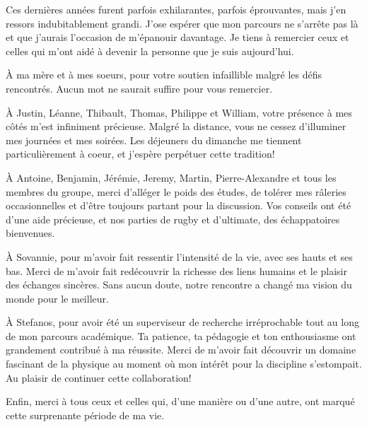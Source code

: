 \begin{comment}
\end{comment}

Ces dernières années furent parfois exhilarantes, parfois éprouvantes, mais j'en ressors indubitablement grandi. J'ose espérer que mon parcours ne s'arrête pas là et que j'aurais l'occasion de m'épanouir davantage. Je tiens à remercier ceux et celles qui m'ont aidé à devenir la personne que je suis aujourd'hui.

À ma mère et à mes soeurs, pour votre soutien infaillible malgré les défis rencontrés. Aucun mot ne saurait suffire pour vous remercier.

À Justin, Léanne, Thibault, Thomas, Philippe et William, votre présence à mes côtés m'est infiniment précieuse. Malgré la distance, vous ne cessez d'illuminer mes journées et mes soirées. Les déjeuners du dimanche me tiennent particulièrement à coeur, et j'espère perpétuer cette tradition!

À Antoine, Benjamin, Jérémie, Jeremy, Martin, Pierre-Alexandre et tous les membres du groupe, merci d'alléger le poids des études, de tolérer mes râleries occasionnelles et d'être toujours partant pour la discussion. Vos conseils ont été d'une aide précieuse, et nos parties de rugby et d'ultimate, des échappatoires bienvenues.

À Sovannie, pour m'avoir fait ressentir l'intensité de la vie, avec ses hauts et ses bas. Merci de m'avoir fait redécouvrir la richesse des liens humains et le plaisir des échanges sincères. Sans aucun doute, notre rencontre a changé ma vision du monde pour le meilleur.

À Stefanos, pour avoir été un superviseur de recherche irréprochable tout au long de mon parcours académique. Ta patience, ta pédagogie et ton enthousiasme ont grandement contribué à ma réussite. Merci de m'avoir fait découvrir un domaine fascinant de la physique au moment où mon intérêt pour la discipline s'estompait. Au plaisir de continuer cette collaboration!

Enfin, merci à tous ceux et celles qui, d'une manière ou d'une autre, ont marqué cette surprenante période de ma vie.

